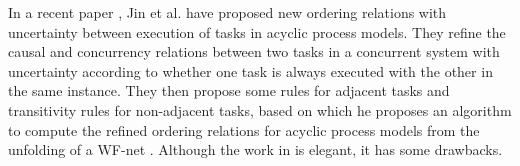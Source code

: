 \documentclass[dvips,...]{llncs}
\begin{document}
In a recent paper \cite{jin2014computing}, Jin et al. have proposed new ordering relations with uncertainty between execution of tasks in acyclic process models. They refine the causal and concurrency relations between two tasks in a concurrent system with uncertainty according to whether one task is always executed with the other in the same instance. They then propose some rules for adjacent tasks and transitivity rules for non-adjacent tasks, based on which he proposes an algorithm to compute the refined ordering relations for acyclic process models from the unfolding of a WF-net \cite{mcmillan1995technique,esparza1996improvement}. Although the work in \cite{jin2014computing} is elegant, it has some drawbacks.

\begin{figure}[htbp]
\centering
{}
\end{figure}
\end{document}
